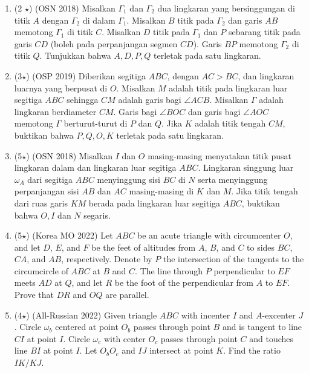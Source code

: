 \documentclass[12pt]{scrartcl}
\begin{document}
\begin{enumerate}
    \item (2 $\star$) (OSN 2018) Misalkan $\Gamma_1$ dan $\Gamma_2$ dua lingkaran yang bersinggungan di titik $A$ dengan $\Gamma_2$ di dalam $\Gamma_1$. Misalkan $B$ titik pada $\Gamma_2$ dan garis $AB$ memotong $\Gamma_1$ di titik $C$. Misalkan $D$ titik pada $\Gamma_1$ dan $P$ sebarang titik pada garis $CD$ (boleh pada perpanjangan segmen $CD$). Garis $BP$ memotong $\Gamma_2$ di titik $Q$. Tunjukkan bahwa $A, D, P, Q$ terletak pada satu lingkaran.

    \item (3$\star$) (OSP 2019) Diberikan segitiga $ABC$, dengan $AC > BC$, dan lingkaran luarnya yang berpusat di $O$. Misalkan $M$ adalah titik pada lingkaran luar segitiga $ABC$ sehingga $CM$ adalah garis bagi $\angle ACB$. Misalkan $\Gamma$ adalah lingkaran berdiameter $CM$. Garis bagi $\angle BOC$ dan garis bagi $\angle AOC$ memotong $\Gamma$ berturut-turut di $P$ dan $Q$. Jika $K$ adalah titik tengah $CM$, buktikan bahwa $P, Q, O, K$ terletak pada satu lingkaran.

    \item (5$\star$) (OSN 2018) Misalkan $I$ dan $O$ masing-masing menyatakan titik pusat lingkaran dalam dan lingkaran luar segitiga $ABC$. Lingkaran singgung luar $\omega_A$ dari segitiga $ABC$ menyinggung sisi $BC$ di $N$ serta menyinggung perpanjangan sisi $AB$ dan $AC$ masing-masing di $K$ dan $M$. Jika titik tengah dari ruas garis $KM$ berada pada lingkaran luar segitiga $ABC$, buktikan bahwa $O, I$ dan $N$ segaris.

    \item (5$\star$) (Korea MO 2022) Let $ABC$ be an acute triangle with circumcenter $O$, and let $D$, $E$, and $F$ be the feet of altitudes from $A$, $B$, and $C$ to sides $BC$, $CA$, and $AB$, respectively. Denote by $P$ the intersection of the tangents to the circumcircle of $ABC$ at $B$ and $C$. The line through $P$ perpendicular to $EF$ meets $AD$ at $Q$, and let $R$ be the foot of the perpendicular from $A$ to $EF$. Prove that $DR$ and $OQ$ are parallel.

    \item (4$\star$) (All-Russian 2022) Given triangle $ABC$ with incenter $I$ and $A$-excenter $J$. Circle $\omega_b$ centered at point $O_b$ passes through point $B$ and is tangent to line $CI$ at point $I$. Circle $\omega_c$ with center $O_c$ passes through point $C$ and touches line $BI$ at point $I$. Let $O_bO_c$ and $IJ$ intersect at point $K$. Find the ratio $IK/KJ$.


\end{enumerate}
\end{document}
